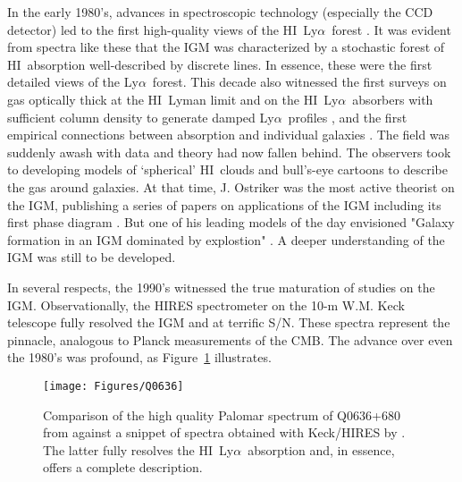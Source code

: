 \documentclass[graybox]{svmult}
\newcommand{\HI}{H{\sc I}}
\def\lya{Ly$\alpha$}
\begin{document}
In the early 1980's, advances in spectroscopic technology
(especially the CCD detector) led to the first high-quality
views of the \HI\ \lya\ forest 
\cite[Figure~\ref{fig:young};][]{young79,boks78,sargent80}.
It was evident from spectra like these that the IGM was
characterized by a stochastic forest of \HI\ absorption
well-described by discrete lines.  
In essence, these were the first detailed views of the
\lya\ forest.
This decade also witnessed the first surveys on gas
optically thick at the \HI\ Lyman limit \cite[aka Lyman Limit Systems 
or LLSs;][]{tytler82}
and on the \HI\ \lya\ absorbers with sufficient column
density to generate damped \lya\ profiles
\cite[aka damped \lya\ systems or DLAs;][]{wolfe86}, and
the first empirical connections between absorption and
individual galaxies \cite[]{bb91}.
The field was suddenly awash with data and theory had
now fallen behind.
The observers took to developing models of 
`spherical' \HI\ clouds and bull's-eye cartoons to 
describe the gas around galaxies.  
At that time, J. Ostriker was the most active theorist on the IGM,
publishing a series of papers on applications of the
IGM including its first phase diagram 
\cite[]{oi83,oh84,bdo88,duncan89}.
But one of his leading models of the day envisioned
"Galaxy formation in an IGM dominated by explostion"
\cite[]{oc81}.
A deeper understanding of the IGM was still to be
developed.


In several respects, the 1990's witnessed the
true maturation of studies on the IGM.  Observationally,
the HIRES spectrometer \cite{vogt94} on the 10-m W.M.
Keck telescope fully resolved the IGM and at terrific
S/N.  These spectra represent
the pinnacle, analogous to Planck measurements of 
the CMB. The advance over even the 1980's was profound,
as Figure~\ref{fig:HIRES} illustrates.

%
\begin{figure}[b]
\sidecaption
\texttt{[image: Figures/Q0636]}
%
%
\caption{Comparison of the high quality Palomar spectrum
of Q0636+680 from \cite{ssb} against a snippet of 
spectra obtained with Keck/HIRES by \cite{songaila02}.
The latter fully resolves the \HI\ \lya\ absorption
and, in essence, offers a complete description.
}
\label{fig:HIRES}       %
\end{figure}
\end{document}
